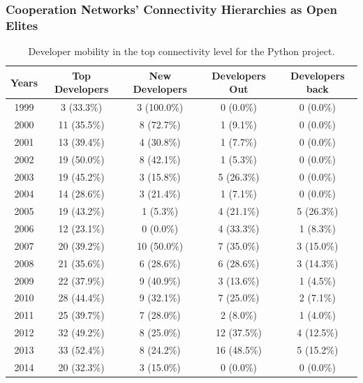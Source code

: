 \documentclass[ignorenonframetext,red,8pt,notes=hide]{beamer}
\begin{document}
\begin{frame}
\frametitle{Cooperation Networks' Connectivity Hierarchies as Open Elites}

\begin{table}[h]
\caption{Developer mobility in the top connectivity level for the Python project.}
\label{python_mobility_table}
\begin{center}
\begin{tabular}{ccccc}
\toprule
Years&Top Developers&New Developers&Developers Out&Developers back \\ 
\midrule
1999&3 (33.3\%)&3 (100.0\%)&0 (0.0\%)&0 (0.0\%) \\ 
2000&11 (35.5\%)&8 (72.7\%)&1 (9.1\%)&0 (0.0\%) \\ 
2001&13 (39.4\%)&4 (30.8\%)&1 (7.7\%)&0 (0.0\%) \\ 
2002&19 (50.0\%)&8 (42.1\%)&1 (5.3\%)&0 (0.0\%) \\ 
2003&19 (45.2\%)&3 (15.8\%)&5 (26.3\%)&0 (0.0\%) \\ 
2004&14 (28.6\%)&3 (21.4\%)&1 (7.1\%)&0 (0.0\%) \\ 
2005&19 (43.2\%)&1 (5.3\%)&4 (21.1\%)&5 (26.3\%) \\ 
2006&12 (23.1\%)&0 (0.0\%)&4 (33.3\%)&1 (8.3\%) \\ 
2007&20 (39.2\%)&10 (50.0\%)&7 (35.0\%)&3 (15.0\%) \\ 
2008&21 (35.6\%)&6 (28.6\%)&6 (28.6\%)&3 (14.3\%) \\ 
2009&22 (37.9\%)&9 (40.9\%)&3 (13.6\%)&1 (4.5\%) \\ 
2010&28 (44.4\%)&9 (32.1\%)&7 (25.0\%)&2 (7.1\%) \\ 
2011&25 (39.7\%)&7 (28.0\%)&2 (8.0\%)&1 (4.0\%) \\ 
2012&32 (49.2\%)&8 (25.0\%)&12 (37.5\%)&4 (12.5\%) \\ 
2013&33 (52.4\%)&8 (24.2\%)&16 (48.5\%)&5 (15.2\%) \\ 
2014&20 (32.3\%)&3 (15.0\%)&0 (0.0\%)&0 (0.0\%) \\ 
\bottomrule
\end{tabular}
\end{center}
\end{table}

\end{frame}
\end{document}
